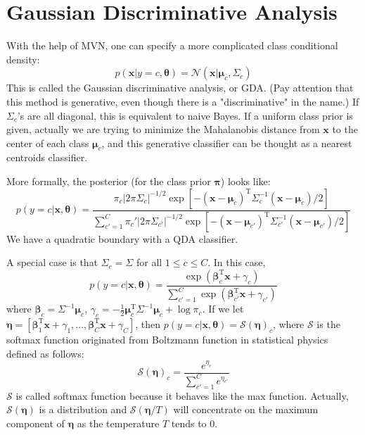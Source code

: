 \documentclass[openany]{book}
\begin{document}
\section{Gaussian Discriminative Analysis}
With the help of MVN, one can specify a more complicated class conditional density:
\begin{equation}\label{mvnclasscond}
p(\mathbf{x}|y=c,\boldsymbol{\theta})=\mathcal{N}(\mathbf{x}|\boldsymbol{\mu}_c,\Sigma_c)
\end{equation}
This is called the Gaussian discriminative analysis, or GDA. (Pay attention that this method is generative, even though there is a "discriminative" in the name.) If $\Sigma_c$'s are all diagonal, this is equivalent to naive Bayes. If a uniform class prior is given, actually we are trying to minimize the Mahalanobis distance from $\mathbf{x}$ to the center of each class $\boldsymbol{\mu}_c$, and this generative classifier can be thought as a nearest centroids classifier.

More formally, the posterior (for the class prior $\boldsymbol{\pi}$) looks like:
\begin{equation}\label{qda}
p(y=c|\mathbf{x},\boldsymbol{\theta})=\frac{\pi_c|2\pi\Sigma_c|^{-1/2}\exp[-(\mathbf{x}-\boldsymbol{\mu}_c)^{\mathrm{T}}\Sigma_c^{-1}(\mathbf{x}-\boldsymbol{\mu}_c)/2]}{\sum_{c'=1}^C\pi_c'|2\pi\Sigma_{c'}|^{-1/2}\exp[-(\mathbf{x}-\boldsymbol{\mu}_{c'})^{\mathrm{T}}\Sigma_{c'}^{-1}(\mathbf{x}-\boldsymbol{\mu}_{c'})/2]}
\end{equation}
We have a quadratic boundary with a QDA classifier.

A special case is that $\Sigma_c=\Sigma$ for all $1\le c\le C$. In this case,
\begin{equation}\label{linearda}
p(y=c|\mathbf{x},\boldsymbol{\theta})=\frac{\exp(\boldsymbol{\beta}_c^{\mathrm{T}}\mathbf{x}+\gamma_c)}{\sum_{c'=1}^C\exp(\boldsymbol{\beta}_{c'}^{\mathrm{T}}\mathbf{x}+\gamma_{c'})}
\end{equation}
where $\boldsymbol{\beta}_c=\Sigma^{-1}\boldsymbol{\mu}_c$, $\gamma_c=-\frac{1}{2}\boldsymbol{\mu}_c^{\mathrm{T}}\Sigma^{-1}\boldsymbol{\mu}_c+\log\pi_c$. If we let $\boldsymbol{\eta}=[\boldsymbol{\beta}_1^{\mathrm{T}}\mathbf{x}+\gamma_1,\ldots,\boldsymbol{\beta}_C^{\mathrm{T}}\mathbf{x}+\gamma_C]$, then $p(y=c|\mathbf{x},\boldsymbol{\theta})=\mathcal{S}(\boldsymbol{\eta})_c$, where $\mathcal{S}$ is the softmax function originated from Boltzmann function in statistical physics defined as follows:
\begin{equation}\label{softmax}
\mathcal{S}(\boldsymbol{\eta})_c=\frac{e^{\eta_c}}{\sum_{c'=1}^Ce^{\eta_{c'}}}
\end{equation}
$\mathcal{S}$ is called softmax function because it behaves like the max function. Actually, $\mathcal{S}(\boldsymbol{\eta})$ is a distribution and $\mathcal{S}(\boldsymbol{\eta}/T)$ will concentrate on the maximum component of $\boldsymbol{\eta}$ as the temperature $T$ tends to 0.
\end{document}

